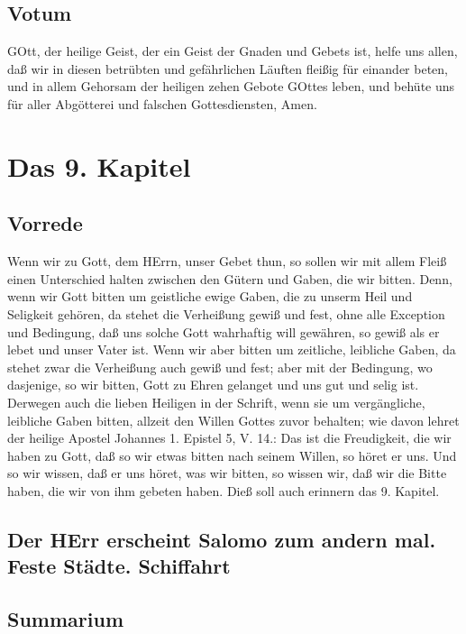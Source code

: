 \section{Votum}

GOtt, der heilige Geist, der ein Geist der Gnaden und Gebets ist, helfe uns allen, daß wir in diesen betrübten und gefährlichen Läuften fleißig für einander beten, und in allem Gehorsam der heiligen zehen Gebote GOttes leben, und behüte uns für aller Abgötterei und falschen Gottesdiensten, Amen.

\chapter{Das 9. Kapitel}

\section{Vorrede}

Wenn wir zu Gott, dem HErrn, unser Gebet thun, so sollen wir mit allem Fleiß einen Unterschied halten zwischen den Gütern und Gaben, die wir bitten. Denn, wenn wir Gott bitten um geistliche ewige Gaben, die zu unserm Heil und Seligkeit gehören, da stehet die Verheißung gewiß und fest, ohne alle Exception und Bedingung, daß uns solche Gott wahrhaftig will gewähren, so gewiß als er lebet und unser Vater ist. Wenn wir aber bitten um zeitliche, leibliche Gaben, da stehet zwar die Verheißung auch gewiß und fest; aber mit der Bedingung, wo dasjenige, so wir bitten, Gott zu Ehren gelanget und uns gut und selig ist. Derwegen auch die lieben Heiligen in der Schrift, wenn sie um vergängliche, leibliche Gaben bitten, allzeit den Willen Gottes zuvor behalten; wie davon lehret
der heilige Apostel Johannes 1. Epistel 5, V. 14.: Das ist die Freudigkeit, die wir haben zu Gott, daß so wir etwas bitten nach seinem Willen, so höret er uns. Und so wir wissen, daß er uns höret, was wir bitten, so wissen wir, daß wir die Bitte haben, die wir von ihm gebeten haben. Dieß soll auch erinnern das 9. Kapitel.

\section[Der HErr erscheint Salomo zum andern mal. Feste]{Der HErr erscheint Salomo zum andern mal. Feste Städte. Schiffahrt}

\section{Summarium}

